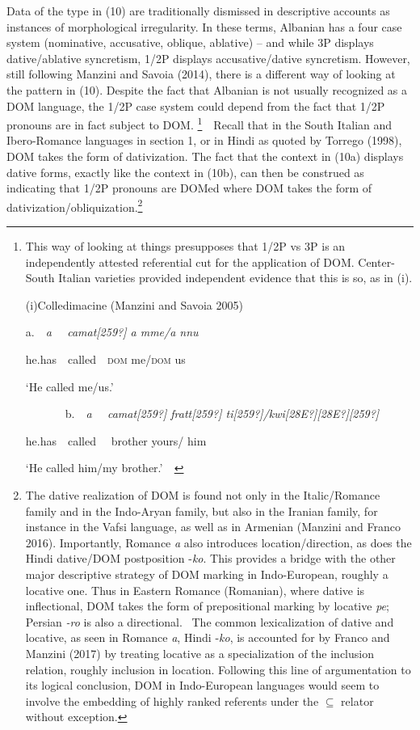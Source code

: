 \documentclass[12pt]{article}
\newcommand\textstyleFootnoteSymbol[1]{{\fontsize{6.5pt}{7.8pt}\selectfont #1}}
\newcommand\textstyleTextonotapieCar[1]{{\fontsize{10pt}{12.0pt}\selectfont \textrm{#1}}}
\newenvironment{styleStandard}{\setlength\leftskip{0cm}\setlength\rightskip{0cm plus 1fil}\setlength\parindent{0cm}\setlength\parfillskip{0pt plus 1fil}\setlength\parskip{0in plus 1pt}\writerlistparindent\writerlistleftskip\leavevmode\normalfont\normalsize\writerlistlabel\ignorespaces}{\unskip\vspace{0.111in plus 0.0111in}\par}
\newcommand\writerlistleftskip{}
\newcommand\writerlistparindent{}
\newcommand\writerlistlabel{}
\begin{document}
\begin{styleStandard}
Data of the type in (10) are traditionally dismissed in descriptive accounts as instances of morphological irregularity. In these terms, Albanian has a four case system (nominative, accusative, oblique, ablative) – and while 3P displays dative/ablative syncretism, 1/2P displays accusative/dative syncretism. However, still following Manzini and Savoia (2014), there is a different way of looking at the pattern in (10). Despite the fact that Albanian is not usually recognized as a DOM language, the 1/2P case system could depend from the fact that 1/2P pronouns are in fact subject to DOM.\textstyleFootnoteSymbol{ }\footnote{This way of looking at things presupposes that 1/2P vs 3P is an independently attested referential cut for the application of DOM. Center-South Italian varieties provided independent evidence that this is so, as in (i).\par \textrm{(i)Colledimacine (Manzini and Savoia 2005)}\par \textrm{a.\ \ }\textrm{\textit{a \ \ camat[259?] a mme/a nnu}}\textrm{\ \ \ \ }\par \textrm{he.has\ \ called\ \ }\textrm{\textsc{dom}}\textrm{ me/}\textrm{\textsc{dom}}\textrm{ us}\par \textrm{‘He called me/us.’}\par \textrm{\ \ \ \ \ \ \ b.\ \ }\textrm{\textit{a \ \ camat[259?] fratt[259?] ti[259?]/kwi[28E?][28E?][259?]}}\textrm{\ \ \ \ }\par \textrm{he.has\ \ called \ \ brother yours/ him \ \ }\par ‘He called him/my brother.’\textit{\ \ } }\textstyleFootnoteSymbol{\ }\ Recall that in the South Italian and Ibero-Romance languages in section 1, or in Hindi as quoted by Torrego (1998), DOM takes the form of dativization. The fact that the context in (10a) displays dative forms, exactly like the context in (10b), can then be construed as indicating that 1/2P pronouns are DOMed where DOM takes the form of dativization/obliquization.\footnote{\textstyleTextonotapieCar{ The dative realization of DOM is found not only in the Italic/Romance family and in the Indo-Aryan family, but also in the Iranian family, for instance in the Vafsi language, as well as in Armenian (Manzini and Franco 2016). Importantly, Romance \textit{a} also introduces location/direction, as does the Hindi dative/DOM postposition -\textit{ko}. }This provides a bridge with the other major descriptive strategy of DOM marking in Indo-European, roughly a locative one. Thus in Eastern Romance (Romanian), where dative is inflectional, DOM takes the form of prepositional marking by locative \textit{pe}; Persian \textit{{}-ro} is also a directional. \ The common lexicalization of dative and locative, as seen in Romance \textit{a}, Hindi -\textit{ko}, is accounted for by Franco and Manzini (2017) by treating locative as a specialization of the inclusion relation, roughly inclusion in location. Following this line of argumentation to its logical conclusion, DOM in Indo-European languages would seem to involve the embedding of highly ranked referents under the \textrm{${\subseteq}$} relator without exception.}\ \ 
\end{styleStandard}
\end{document}
